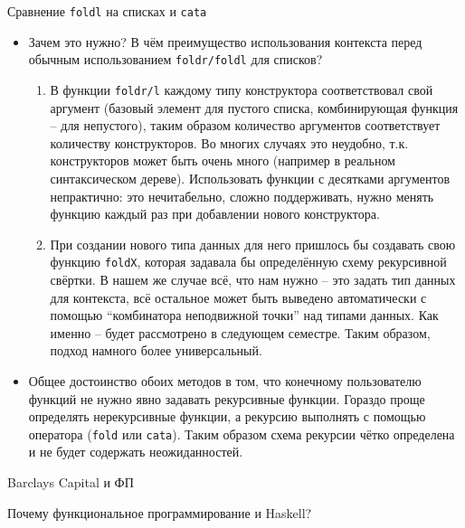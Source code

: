 \documentclass{beamer}
\begin{document}
\begin{frame}{Сравнение \texttt{foldl} на списках и \texttt{cata}}

\begin{itemize}
\item
  Зачем это нужно? В чём преимущество использования контекста перед
  обычным использованием \texttt{foldr/foldl} для списков?

  \begin{enumerate}[1.]
  \item
    В функции \texttt{foldr/l} каждому типу конструктора соответствовал
    свой аргумент (базовый элемент для пустого списка, комбинирующая
    функция -- для непустого), таким образом количество аргументов
    соответствует количеству конструкторов. Во многих случаях это
    неудобно, т.к. конструкторов может быть очень много (например в
    реальном синтаксическом дереве). Использовать функции с десятками
    аргументов непрактично: это нечитабельно, сложно поддерживать, нужно
    менять функцию каждый раз при добавлении нового конструктора.
  \item
    При создании нового типа данных для него пришлось бы создавать свою
    функцию \texttt{foldX}, которая задавала бы определённую схему
    рекурсивной свёртки. В нашем же случае всё, что нам нужно -- это
    задать тип данных для контекста, всё остальное может быть выведено
    автоматически с помощью ``комбинатора неподвижной точки'' над типами
    данных. Как именно -- будет рассмотрено в следующем семестре. Таким
    образом, подход намного более универсальный.
  \end{enumerate}
\item
  Общее достоинство обоих методов в том, что конечному пользователю
  функций не нужно явно задавать рекурсивные функции. Гораздо проще
  определять нерекурсивные функции, а рекурсию выполнять с помощью
  оператора (\texttt{fold} или \texttt{cata}). Таким образом схема
  рекурсии чётко определена и не будет содержать неожиданностей.
\end{itemize}
\end{frame}\begin{frame}{Barclays Capital и ФП}

Почему функциональное программирование и Haskell?


\end{frame}
\end{document}
